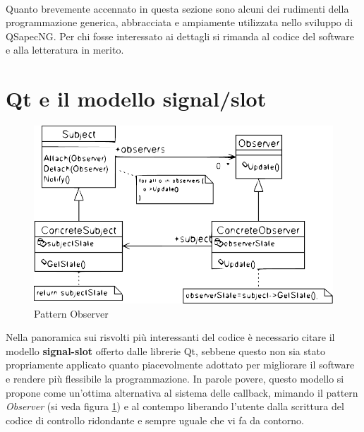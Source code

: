 \paragraph{}
Quanto brevemente accennato in questa sezione sono alcuni dei rudimenti della programmazione generica, abbracciata e ampiamente utilizzata nello sviluppo di QSapecNG. Per chi fosse interessato ai dettagli si rimanda al codice del software e alla letteratura in merito.

\section{Qt e il modello signal/slot}

\begin{figure}[ht]
 \centering
 \includegraphics[scale=0.80]{immagini/observer.pdf}
 \caption{Pattern Observer}
 \label{fig:observer}
\end{figure}

Nella panoramica sui risvolti più interessanti del codice è necessario citare il modello \textbf{signal-slot} offerto dalle librerie Qt, sebbene questo non sia stato propriamente applicato quanto piacevolmente adottato per migliorare il software e rendere più flessibile la programmazione. In parole povere, questo modello si propone come un'ottima alternativa al sistema delle callback, mimando il pattern \textit{Observer} (si veda figura \ref{fig:observer}) e al contempo liberando l'utente dalla scrittura del codice di controllo ridondante e sempre uguale che vi fa da contorno.

